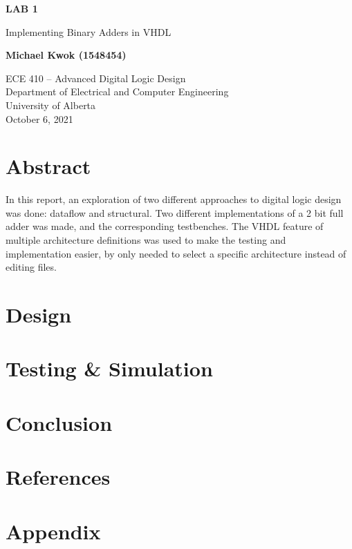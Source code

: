 \documentclass[12pt]{article}
\begin{document}
\begin{titlepage}
    \begin{center}
        \vspace*{1cm}

        \textbf{LAB 1}

        \vspace{0.5cm}

        Implementing Binary Adders in VHDL

        \vspace{1.5cm}

        \textbf{Michael Kwok (1548454)}

        \vfill

        ECE 410 -- Advanced Digital Logic Design\\
        Department of Electrical and Computer Engineering\\
        University of Alberta\\
        October 6, 2021

    \end{center}
\end{titlepage}

\tableofcontents

\pagebreak

\section{Abstract}

In this report, an exploration of two different approaches to digital logic design was done: dataflow and structural.
Two different implementations of a 2 bit full adder was made, and the corresponding testbenches.
The VHDL feature of multiple architecture definitions was used to make the testing and implementation easier,
by only needed to select a specific architecture instead of editing files.

\section{Design}

\section{Testing \& Simulation}

\section{Conclusion}

\section{References}

\pagebreak
\section{Appendix}

\renewcommand{\thepage}{}
\end{document}
